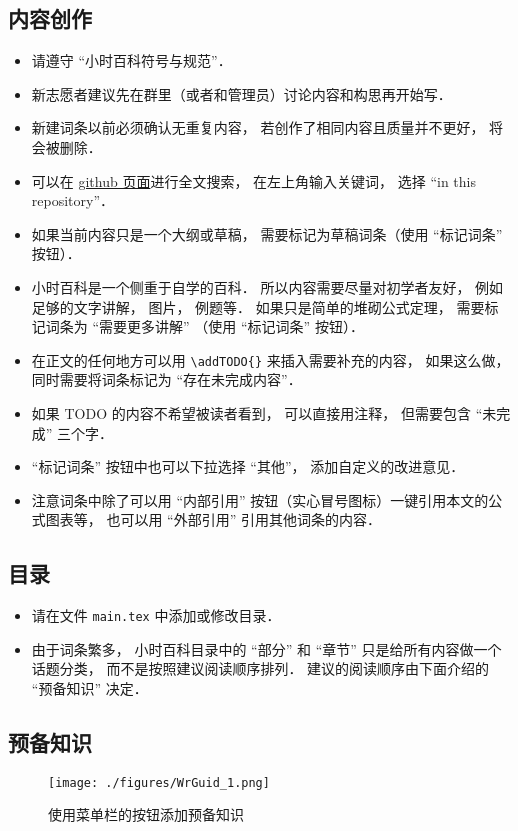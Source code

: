 
\subsection{内容创作}
\begin{itemize}
\item 请遵守 “小时百科符号与规范”．
\item 新志愿者建议先在群里（或者和管理员）讨论内容和构思再开始写．
\item 新建词条以前必须确认无重复内容， 若创作了相同内容且质量并不更好， 将会被删除．
\item 可以在 \href{https://github.com/MacroUniverse/PhysWiki}{github 页面}进行全文搜索， 在左上角输入关键词， 选择 “in this repository”．
\item 如果当前内容只是一个大纲或草稿， 需要标记为草稿词条（使用 “标记词条” 按钮）．
\item 小时百科是一个侧重于自学的百科． 所以内容需要尽量对初学者友好， 例如足够的文字讲解， 图片， 例题等． 如果只是简单的堆砌公式定理， 需要标记词条为 “需要更多讲解” （使用 “标记词条” 按钮）．
\item 在正文的任何地方可以用 \verb|\addTODO{}| 来插入需要补充的内容， 如果这么做， 同时需要将词条标记为 “存在未完成内容”．
\item 如果 TODO 的内容不希望被读者看到， 可以直接用注释， 但需要包含 “未完成” 三个字．
\item “标记词条” 按钮中也可以下拉选择 “其他”， 添加自定义的改进意见．
\item 注意词条中除了可以用 “内部引用” 按钮（实心冒号图标）一键引用本文的公式图表等， 也可以用 “外部引用” 引用其他词条的内容．
\end{itemize}

\subsection{目录}
\begin{itemize}
\item 请在文件 \verb|main.tex| 中添加或修改目录．
\item 由于词条繁多， 小时百科目录中的 “部分” 和 “章节” 只是给所有内容做一个话题分类， 而不是按照建议阅读顺序排列． 建议的阅读顺序由下面介绍的 “预备知识” 决定．
\end{itemize}

\subsection{预备知识}
\begin{figure}[ht]
\centering
\texttt{[image: ./figures/WrGuid\_1.png]}
\caption{使用菜单栏的按钮添加预备知识} \label{WrGuid_fig1}
\end{figure}

